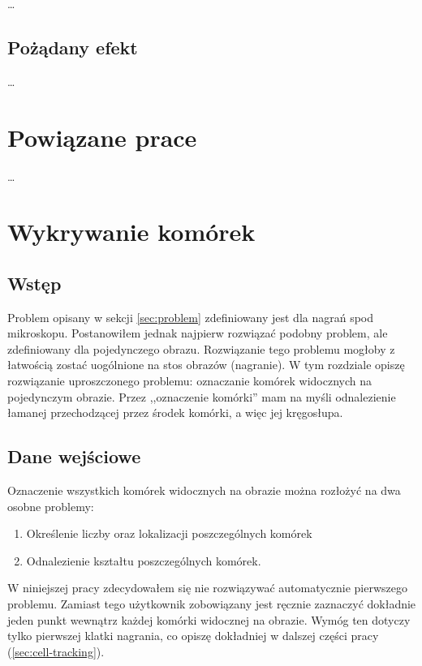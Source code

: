 \documentclass[declaration,shortabstract,mgr]{iithesis}
\begin{document}
\ldots %

\subsection{Pożądany efekt}
\label{sec:output}

\ldots %

\section{Powiązane prace}

\ldots %

\section{Wykrywanie komórek}
\label{sec:cell-detection}

\subsection{Wstęp}

Problem opisany w sekcji \ref{sec:problem} zdefiniowany jest dla nagrań spod mikroskopu. Postanowiłem jednak najpierw rozwiązać podobny problem, ale zdefiniowany dla pojedynczego obrazu. Rozwiązanie tego problemu mogłoby z łatwością zostać uogólnione na stos obrazów (nagranie). W tym rozdziale opiszę rozwiązanie uproszczonego problemu: oznaczanie komórek widocznych na pojedynczym obrazie. Przez ,,oznaczenie komórki'' mam na myśli odnalezienie łamanej przechodzącej przez środek komórki, a więc jej kręgosłupa.

\subsection{Dane wejściowe}
\label{sec:detection-input}

Oznaczenie wszystkich komórek widocznych na obrazie można rozłożyć na dwa osobne problemy:
\begin{enumerate}
  \item Określenie liczby oraz lokalizacji poszczególnych komórek
  \item Odnalezienie kształtu poszczególnych komórek.
\end{enumerate}

W niniejszej pracy zdecydowałem się nie rozwiązywać automatycznie pierwszego problemu. Zamiast tego użytkownik zobowiązany jest ręcznie zaznaczyć dokładnie jeden punkt wewnątrz każdej komórki widocznej na obrazie. Wymóg ten dotyczy tylko pierwszej klatki nagrania, co opiszę dokładniej w dalszej części pracy (\ref{sec:cell-tracking}).
\end{document}
